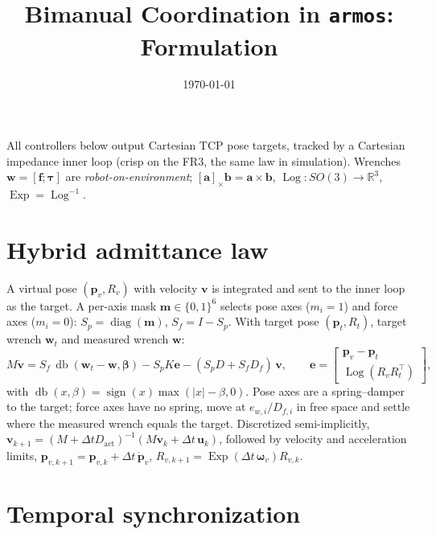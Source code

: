 \documentclass[11pt,a4paper]{article}
\title{Bimanual Coordination in \texttt{armos}: Formulation}
\date{\today}
\newcommand{\vect}[1]{\boldsymbol{#1}}
\newcommand{\skewm}[1]{[\vect{#1}]_\times}
\DeclareMathOperator{\db}{db}
\DeclareMathOperator{\Log}{Log}
\DeclareMathOperator{\Exp}{Exp}
\DeclareMathOperator{\diag}{diag}
\begin{document}
\maketitle

\noindent All controllers below output Cartesian TCP pose targets, tracked by a Cartesian impedance inner loop
(crisp on the FR3, the same law in simulation). Wrenches $\vect w=[\vect f;\vect\tau]$ are \emph{robot-on-environment};
$\skewm{a}\vect b=\vect a\times\vect b$, $\Log:SO(3)\to\mathbb R^3$, $\Exp=\Log^{-1}$.

\section{Hybrid admittance law}\label{sec:adm}

A virtual pose $(\vect p_v,R_v)$ with velocity $\vect v$ is integrated and sent to the inner loop as the target. A
per-axis mask $\vect m\in\{0,1\}^6$ selects pose axes ($m_i=1$) and force axes ($m_i=0$):
$S_p=\diag(\vect m)$, $S_f=I-S_p$. With target pose $(\vect p_t,R_t)$, target wrench $\vect w_t$ and measured wrench
$\vect w$:
\begin{equation}
  M\dot{\vect v} = S_f\,\db(\vect w_t-\vect w,\vect\beta) - S_pK\vect e - (S_pD+S_fD_f)\,\vect v,
  \qquad
  \vect e=\begin{bmatrix}\vect p_v-\vect p_t\\ \Log(R_vR_t^\top)\end{bmatrix},
  \label{eq:adm}
\end{equation}
with $\db(x,\beta)=\operatorname{sign}(x)\max(|x|-\beta,0)$. Pose axes are a spring--damper to the target; force axes
have no spring, move at $e_{w,i}/D_{f,i}$ in free space and settle where the measured wrench equals the target.
Discretized semi-implicitly, $\vect v_{k+1}=(M+\Delta tD_{\mathrm{act}})^{-1}(M\vect v_k+\Delta t\,\vect u_k)$, followed by
velocity and acceleration limits, $\vect p_{v,k+1}=\vect p_{v,k}+\Delta t\,\dot{\vect p}_v$,
$R_{v,k+1}=\Exp(\Delta t\,\vect\omega_v)R_{v,k}$.

\section{Temporal synchronization}\label{sec:temporal}
\end{document}
